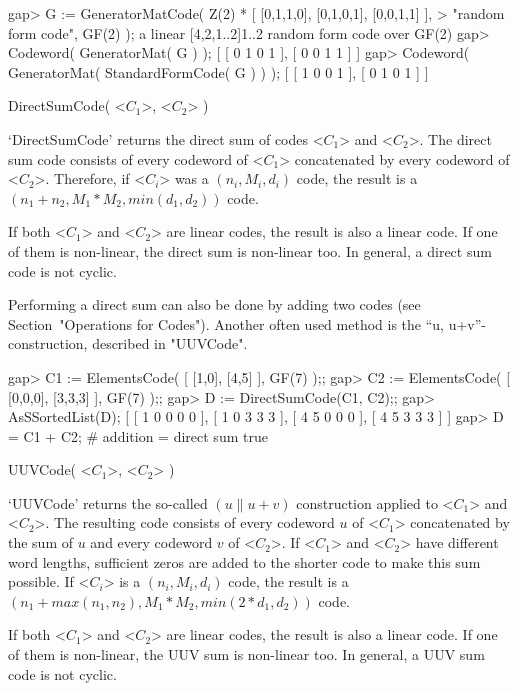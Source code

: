 \beginexample
gap> G := GeneratorMatCode( Z(2) * [ [0,1,1,0], [0,1,0,1], [0,0,1,1] ],
> "random form code", GF(2) );
a linear [4,2,1..2]1..2 random form code over GF(2)
gap> Codeword( GeneratorMat( G ) );
[ [ 0 1 0 1 ], [ 0 0 1 1 ] ]
gap> Codeword( GeneratorMat( StandardFormCode( G ) ) );
[ [ 1 0 0 1 ], [ 0 1 0 1 ] ] 
\endexample


\>DirectSumCode( <$C_1$>, <$C_2$> )

`DirectSumCode' returns the direct sum  of codes <$C_1$> and <$C_2$>. The
direct sum  code  consists of every codeword   of <$C_1$> concatenated by
every codeword  of <$C_2$>. Therefore, if  <$C_i$> was  a $(n_i,M_i,d_i)$
code, the result is a $(n_1+n_2,M_1*M_2,min(d_1,d_2))$ code.

If both <$C_1$> and <$C_2$> are linear codes, the result is also a linear
code. If one of them is non-linear, the  direct sum is non-linear too. In
general, a direct sum code is not cyclic.

Performing  a direct   sum can also  be done   by adding two   codes (see
Section~"Operations for Codes"). Another often used method is  the  ``u,
u+v''-construction, described in "UUVCode".

\beginexample
gap> C1 := ElementsCode( [ [1,0], [4,5] ], GF(7) );;
gap> C2 := ElementsCode( [ [0,0,0], [3,3,3] ], GF(7) );;
gap> D := DirectSumCode(C1, C2);;
gap> AsSSortedList(D);
[ [ 1 0 0 0 0 ], [ 1 0 3 3 3 ], [ 4 5 0 0 0 ], [ 4 5 3 3 3 ] ]
gap> D = C1 + C2;   # addition = direct sum
true 
\endexample

\>UUVCode( <$C_1$>, <$C_2$> )

`UUVCode'  returns  the  so-called  $(u\|u+v)$ construction   applied  to
<$C_1$> and <$C_2$>. The resulting code consists of every codeword $u$ of
<$C_1$> concatenated   by  the sum   of  $u$ and  every   codeword $v$ of
<$C_2$>.  If <$C_1$> and <$C_2$> have  different word lengths, sufficient
zeros are added to the shorter code to make this sum possible. If <$C_i$>
is  a        $(n_i,M_i,d_i)$   code,          the  result    is         a
$(n_1+max(n_1,n_2),M_1*M_2,min(2*d_1,d_2))$ code.

If both <$C_1$> and <$C_2$> are linear codes, the result is also a linear
code. If one  of them is non-linear, the  UUV  sum is non-linear too.  In
general, a UUV sum code is not cyclic.

